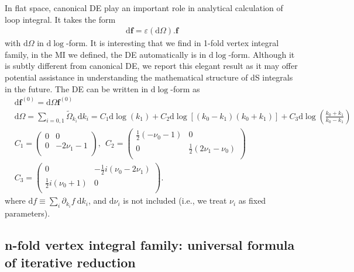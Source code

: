 \documentclass[a4paper,11pt]{article}
\newcommand{\ep}{\varepsilon}
\newcommand{\nn}{\nonumber}
\newcommand{\nd}{\mathrm{d}}
\begin{document}
In flat space, canonical DE play an important role in analytical calculation of loop integral. It takes the form
\begin{align}
\nd \bm{f} = \ep (\nd\Omega).\bm{f}
\end{align}
with $\nd \Omega$ in $\nd \log$-form. It is interesting that we find in 1-fold vertex integral family, in the MI we defined, the DE automatically is in $\nd \log$-form. Although it is subtly different from canonical DE, we report this elegant result as it may offer potential assistance in understanding the mathematical structure of dS integrals in the future. The DE can be written in $\nd \log$-form as
\begin{align}
&\nd \bm{f}^{(0)}= \nd\Omega \bm{f}^{(0)} \nn\\
&\nd\Omega = \sum_{i=0,1}\tilde{\Omega}_{k_i} \nd k_i = C_1 \nd\log(k_1) + C_2 \nd\log[(k_0-k_1)(k_0+k_1)]+C_3 \nd\log\left(\frac{k_0+k_1}{k_0-k_1}\right)\nn\\
&C_1=\left(
\begin{array}{cc}
 0 & 0 \\
 0 & -2 \nu _1-1 \\
\end{array}
\right) ,    ~~   C_2=\left(
\begin{array}{cc}
 \frac{1}{2} \left(-\nu _0-1\right) & 0 \\
 0 & \frac{1}{2} \left(2 \nu _1-\nu _0\right) \\
\end{array}
\right)\nn\\
&C_3=\left(
\begin{array}{cc}
 0 & -\frac{1}{2} i \left(\nu _0-2 \nu _1\right) \\
 \frac{1}{2} i \left(\nu _0+1\right) & 0 \\
\end{array}
\right).
\end{align}
where $\nd f \equiv \sum_i  \partial_{k_i} f ~ \nd k_i$, and $\nd \nu_i$ is not included (i.e., we treat $\nu_i$ as fixed parameters). 


\subsection{n-fold vertex integral family: universal formula of iterative reduction}  \label{sec:3.4}
\end{document}
